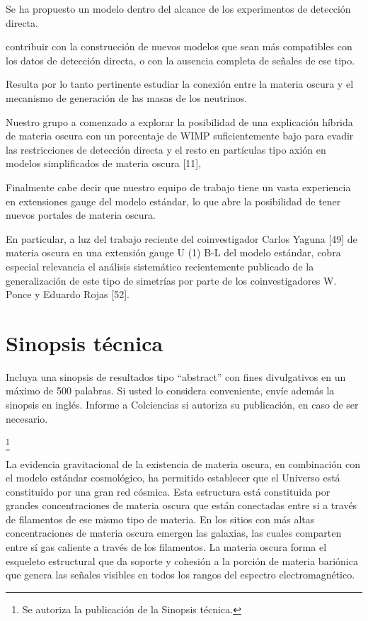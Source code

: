 \begin{ideas}
Se ha propuesto un modelo dentro del alcance de los experimentos de detección directa.


contribuir con la construcción de nuevos modelos que
sean más compatibles con los datos de detección directa, o con la ausencia completa de señales de ese
tipo.

Resulta por lo tanto pertinente estudiar la conexión
entre la materia oscura y el mecanismo de generación de las masas de los neutrinos.

Nuestro grupo a comenzado a explorar la posibilidad de una explicación
híbrida de materia oscura con un porcentaje de WIMP suficientemente bajo para evadir las restricciones
de detección directa y el resto en partículas tipo axión en modelos simplificados de materia oscura [11],


Finalmente cabe decir que nuestro equipo de trabajo tiene un vasta experiencia en extensiones gauge
del modelo estándar, lo que abre la posibilidad de tener nuevos portales de materia oscura.

En particular,
a luz del trabajo reciente del coinvestigador Carlos Yaguna [49] de materia oscura en una extensión gauge
U (1) B-L del modelo estándar, cobra especial relevancia el análisis sistemático recientemente publicado
de la generalización de este tipo de simetrías por parte de los coinvestigadores W. Ponce y Eduardo
Rojas [52].


\end{ideas}




\section{Sinopsis técnica}
\begin{instrucciones}
Incluya una sinopsis de resultados tipo “abstract” con fines divulgativos en un máximo de 500 palabras. Si usted lo considera conveniente, envíe además la
sinopsis en inglés. Informe a Colciencias si autoriza su publicación, en caso de ser necesario. 
\end{instrucciones}

{}\footnote{Se autoriza la publicación de la Sinopsis técnica.}

La evidencia gravitacional de la existencia de materia oscura, en
combinación con el modelo estándar cosmológico, ha permitido
establecer que el Universo está constituido por una gran red
cósmica. Esta estructura está constituida por grandes concentraciones
de materia oscura que están conectadas entre si a través de
filamentos de ese mismo tipo de materia. En los sitios con más altas
concentraciones de materia oscura emergen las galaxias, las cuales comparten entre sí gas
caliente a través de los filamentos. La materia oscura forma el
esqueleto estructural que da soporte y cohesión a la porción de
materia bariónica que genera las señales visibles en todos los rangos
del espectro electromagnético.


